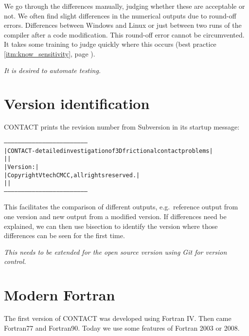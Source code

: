 \documentclass[12pt]{report}
\begin{document}
We go through the differences manually, judging whether these are
acceptable or not. We often find slight differences in the numerical
outputs due to round-off errors. Differences between Windows and Linux or
just between two runs of the compiler after a code modification. This
round-off error cannot be circumvented. It takes some training to judge
quickly where this occurs (best practice \ref{itm:know_sensitivity}, page
\pageref{itm:know_sensitivity}).

{\em It is desired to automate testing.}

\section{Version identification}

CONTACT prints the revision number from Subversion in its startup message:
\begin{alltt}
   ------------------------------------------------------------------------
   |  CONTACT - detailed investigation of 3D frictional contact problems  |
   |                                                                      |
   |  Version:           |
   |  Copyright Vtech CMCC, all rights reserved.                          |
   |                        |
   ------------------------------------------------------------------------
\end{alltt}
This facilitates the comparison of different outputs, e.g.\ reference
output from one version and new output from a modified version. If
differences need be explained, we can then use bisection to identify the
version where those differences can be seen for the first time.

{\em This needs to be extended for the open source version using Git for 
version control.}

\section{Modern Fortran}

The first version of CONTACT was developed using Fortran IV. Then came
Fortran77 and Fortran90. Today we use some features of Fortran 2003 or
2008. 
\end{document}
